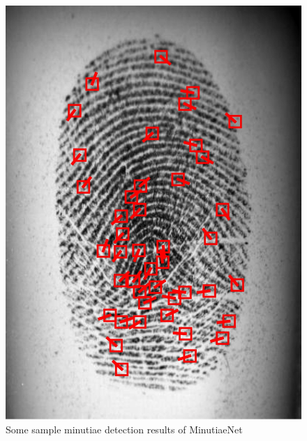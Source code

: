 \begin{figure}[htbp]
    \includegraphics[width=\figwidth\linewidth]{fig/minutiaenet/5.jpg}
    \caption{Some sample minutiae detection results of MinutiaeNet \cite{MinutiaeNet}}
    \label{fig:minutiaenet-results}
\end{figure}

